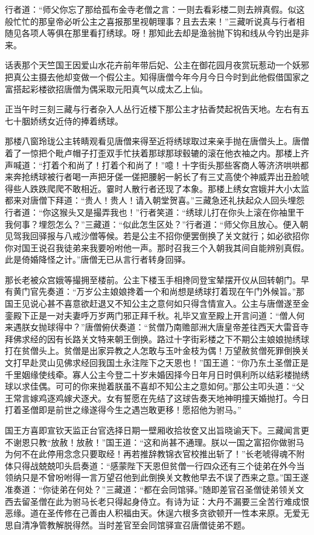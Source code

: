 \documentclass[12pt,UTF8]{ctexbook}
\begin{document}
{	行者道：“师父你忘了那给孤布金寺老僧之言：一则去看彩楼二则去辨真假。似这般忙忙的那皇帝必听公主之喜报那里视朝理事？且去去来！”三藏听说真与行者相随见各项人等俱在那里看打绣球。呀！那知此去却是渔翁抛下钩和线从今钓出是非来。
	
	话表那个天竺国王因爱山水花卉前年带后妃、公主在御花园月夜赏玩惹动一个妖邪把真公主摄去他却变做一个假公主。知得唐僧今年今月今日今时到此他假借国家之富搭起彩楼欲招唐僧为偶采取元阳真气以成太乙上仙。
	
	正当午时三刻三藏与行者杂入人丛行近楼下那公主才拈香焚起祝告天地。左右有五七十胭娇绣女近侍的捧着绣球。
	
	那楼八窗玲珑公主转睛观看见唐僧来得至近将绣球取过来亲手抛在唐僧头上。唐僧着了一惊把个毗卢帽子打歪双手忙扶着那球那球毂辘的滚在他衣袖之内。那楼上齐声喊道：“打着个和尚了！打着个和尚了！”噫！十字街头那些客商人等济济哄哄都来奔抢绣球被行者喝一声把牙傞一傞把腰躬一躬长了有三丈高使个神威弄出丑脸唬得些人跌跌爬爬不敢相近。霎时人散行者还现了本象。那楼上绣女宫娥并大小太监都来对唐僧下拜道：“贵人！贵人！请入朝堂贺喜。”三藏急还礼扶起众人回头埋怨行者道：“你这猴头又是撮弄我也！”行者笑道：“绣球儿打在你头上滚在你袖里干我何事？埋怨怎么？”三藏道：“似此怎生区处？”行者道：“师父你且放心。便入朝见驾我回驿报与八戒沙僧等候。若是公主不招你便罢倒换了关文就行；如必欲招你你对国王说召我徒弟来我要吩咐他一声。那时召我三个入朝我其间自能辨别真假。此是倚婚降怪之计。”唐僧无已从言行者转身回驿。
	
	那长老被众宫娥等撮拥至楼前。公主下楼玉手相搀同登宝辇摆开仪从回转朝门。早有黄门官先奏道：“万岁公主娘娘搀着一个和尚想是绣球打着现在午门外候旨。”那国王见说心甚不喜意欲赶退又不知公主之意何如只得含情宣入。公主与唐僧遂至金銮殿下正是一对夫妻呼万岁两门邪正拜千秋。礼毕又宣至殿上开言问道：“僧人何来遇朕女抛球得中？”唐僧俯伏奏道：“贫僧乃南赡部洲大唐皇帝差往西天大雷音寺拜佛求经的因有长路关文特来朝王倒换。路过十字街彩楼之下不期公主娘娘抛绣球打在贫僧头上。贫僧是出家异教之人怎敢与玉叶金枝为偶！万望赦贫僧死罪倒换关文打早赴灵山见佛求经回我国土永注陛下之天恩也！”国王道：“你乃东土圣僧正是千里姻缘使线牵。寡人公主今登二十岁未婚因择今日年月日时俱利所以结彩楼抛绣球以求佳偶。可可的你来抛着朕虽不喜却不知公主之意如何。”那公主叩头道：“父王常言嫁鸡逐鸡嫁犬逐犬。女有誓愿在先结了这球告奏天地神明撞天婚抛打。今日打着圣僧即是前世之缘遂得今生之遇岂敢更移！愿招他为驸马。”
	
	国王方喜即宣钦天监正台官选择日期一壁厢收拾妆奁又出旨晓谕天下。三藏闻言更不谢恩只教“放赦！放赦！”国王道：“这和尚甚不通理。朕以一国之富招你做驸马为何不在此停用念念只要取经！再若推辞教锦衣官校推出斩了！”长老唬得魂不附体只得战兢兢叩头启奏道：“感蒙陛下天恩但贫僧一行四众还有三个徒弟在外今当领纳只是不曾吩咐得一言万望召他到此倒换关文教他早去不误了西来之意。”国王遂准奏道：“你徒弟在何处？”三藏道：“都在会同馆驿。”随即差官召圣僧徒弟领关文西去留圣僧在此为驸马长老只得起身侍立。有诗为证：大丹不漏要三全苦行难成恨恶缘。道在圣传修在己善由人积福由天。休逞六根多贪欲顿开一性本来原。无爱无思自清净管教解脱得然。当时差官至会同馆驿宣召唐僧徒弟不题。
	
}
\end{document}

